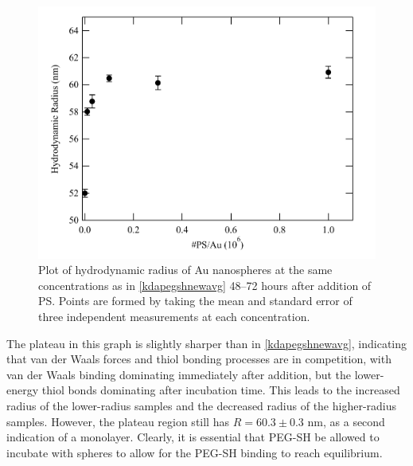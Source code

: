 \begin{figure}[htbp]
\centering
\includegraphics[keepaspectratio,width=\textwidth,height=0.75\textheight]{TimeAvg.pdf}
\caption{Plot of hydrodynamic radius of Au nanospheres at the same concentrations as in \autoref{kdapegshnewavg} 48--72 hours after addition of PS. Points are formed by taking the mean and standard error of three independent measurements at each concentration.}
\label{kdapegshtime}
\end{figure}



The plateau in this graph is slightly sharper than in \autoref{kdapegshnewavg}, indicating that van der Waals forces and thiol bonding processes are in competition, with van der Waals binding dominating immediately after addition, but the lower-energy thiol bonds dominating after incubation time. This leads to the increased radius of the lower-radius samples and the decreased radius of the higher-radius samples. However, the plateau region still has $R=60.3\pm0.3$ nm, as a second indication of a monolayer. Clearly, it is essential that PEG-SH be allowed to incubate with spheres to allow for the PEG-SH binding to reach equilibrium.

